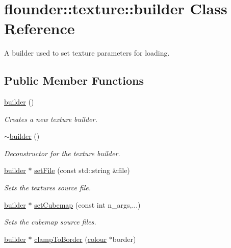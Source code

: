 \hypertarget{classflounder_1_1texture_1_1builder}{}\section{flounder\+:\+:texture\+:\+:builder Class Reference}
\label{classflounder_1_1texture_1_1builder}


A builder used to set texture parameters for loading.  


\subsection*{Public Member Functions}
\begin{DoxyCompactItemize}
\item 
\hyperlink{classflounder_1_1texture_1_1builder_a27fbdb4c16d74fd63c680b992911f41a}{builder} ()
\begin{DoxyCompactList}\small\item\em Creates a new texture builder. \end{DoxyCompactList}\item 
\hyperlink{classflounder_1_1texture_1_1builder_a4942b7196e535632cfe38906c3fe7602}{$\sim$builder} ()
\begin{DoxyCompactList}\small\item\em Deconstructor for the texture builder. \end{DoxyCompactList}\item 
\hyperlink{classflounder_1_1texture_1_1builder}{builder} $\ast$ \hyperlink{classflounder_1_1texture_1_1builder_a297b1c5ebff43f1764120e18e3d77d7b}{set\+File} (const std\+::string \&file)
\begin{DoxyCompactList}\small\item\em Sets the textures source file. \end{DoxyCompactList}\item 
\hyperlink{classflounder_1_1texture_1_1builder}{builder} $\ast$ \hyperlink{classflounder_1_1texture_1_1builder_ad6813f7dd9b094cd3764c5879171dc04}{set\+Cubemap} (const int n\+\_\+args,...)
\begin{DoxyCompactList}\small\item\em Sets the cubemap source files. \end{DoxyCompactList}\item 
\hyperlink{classflounder_1_1texture_1_1builder}{builder} $\ast$ \hyperlink{classflounder_1_1texture_1_1builder_ad072bfe8ecf605c8376886873f66aa9d}{clamp\+To\+Border} (\hyperlink{classflounder_1_1colour}{colour} $\ast$border)

\end{DoxyCompactItemize}
